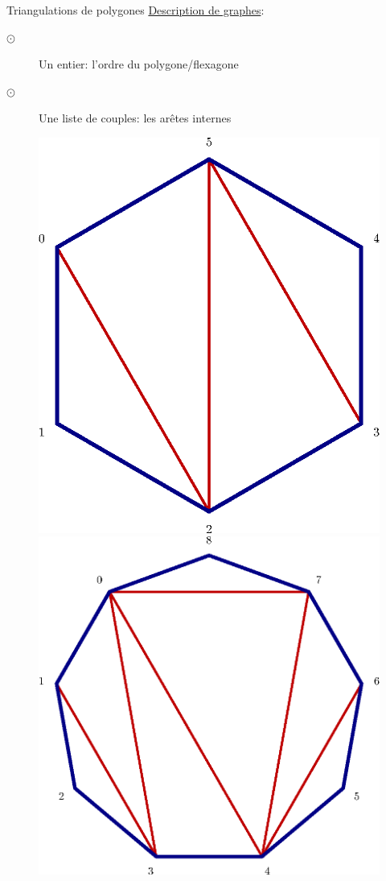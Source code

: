 \documentclass[french,xcolor=dvipsnames]{beamer}
\begin{document}
		\begin{frame}{Triangulations de polygones}
		\underline{Description de graphes}:\\
			\begin{description}
			\item[$\odot$]Un entier: l'ordre du polygone/flexagone
			\item[$\odot$]Une liste de couples: les arêtes internes
			\end{description}
			\begin{figure}
				\includegraphics[scale=0.3]{exemple_6_rot.eps}\bigskip 
				\includegraphics[scale=0.3]{exemple_triangu_9.eps}

\end{figure}
\end{frame}
\end{document}
